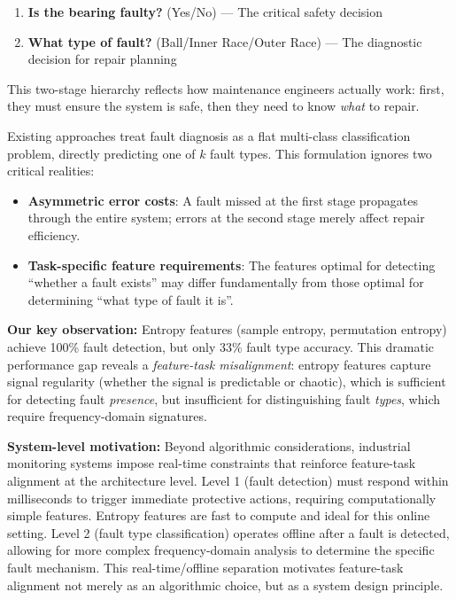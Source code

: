 \documentclass[11pt]{article}
\begin{document}
\begin{enumerate}
    \item \textbf{Is the bearing faulty?} (Yes/No) --- The critical safety decision
    \item \textbf{What type of fault?} (Ball/Inner Race/Outer Race) --- The diagnostic decision for repair planning
\end{enumerate}

This two-stage hierarchy reflects how maintenance engineers actually work: first, they must ensure the system is safe, then they need to know \emph{what} to repair.

Existing approaches treat fault diagnosis as a flat multi-class classification problem, directly predicting one of $k$ fault types. This formulation ignores two critical realities:

\begin{itemize}
    \item \textbf{Asymmetric error costs}: A fault missed at the first stage propagates through the entire system; errors at the second stage merely affect repair efficiency.
    \item \textbf{Task-specific feature requirements}: The features optimal for detecting ``whether a fault exists'' may differ fundamentally from those optimal for determining ``what type of fault it is''.
\end{itemize}

\textbf{Our key observation:} Entropy features (sample entropy, permutation entropy) achieve 100\% fault detection, but only 33\% fault type accuracy. This dramatic performance gap reveals a \emph{feature-task misalignment}: entropy features capture signal regularity (whether the signal is predictable or chaotic), which is sufficient for detecting fault \emph{presence}, but insufficient for distinguishing fault \emph{types}, which require frequency-domain signatures.

\textbf{System-level motivation:} Beyond algorithmic considerations, industrial monitoring systems impose real-time constraints that reinforce feature-task alignment at the architecture level. Level 1 (fault detection) must respond within milliseconds to trigger immediate protective actions, requiring computationally simple features. Entropy features are fast to compute and ideal for this online setting. Level 2 (fault type classification) operates offline after a fault is detected, allowing for more complex frequency-domain analysis to determine the specific fault mechanism. This real-time/offline separation motivates feature-task alignment not merely as an algorithmic choice, but as a system design principle.
\end{document}
